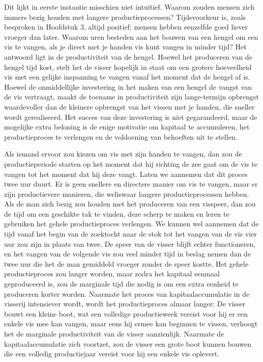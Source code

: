Dit lijkt in eerste instantie misschien niet intuïtief. Waarom zouden mensen zich immers bezig houden met langere productieprocessen? Tijdsvoorkeur is, zoals besproken in Hoofdstuk 3, altijd positief; mensen hebben eenzelfde goed liever vroeger dan later. Waarom uren besteden aan het bouwen van een hengel om een vis te vangen, als je direct met je handen vis kunt vangen in minder tijd? Het antwoord ligt in de productiviteit van de hengel. Hoewel het produceren van de hengel tijd kost, stelt het de visser hopelijk in staat om een grotere hoeveelheid vis met een gelijke inspanning te vangen vanaf het moment dat de hengel af is. Hoewel de onmiddellijke investering in het maken van een hengel de vangst van de vis vertraagt, maakt de toename in productiviteit zijn lange-termijn opbrengst waardevoller dan de kleinere opbrengst van het vissen met je handen, die sneller wordt gerealiseerd. Het succes van deze investering is niet gegarandeerd, maar de mogelijke extra beloning is de enige motivatie om kapitaal te accumuleren, het productieproces te verlengen en de voldoening van behoeften uit te stellen.\autocite{59a, 59b}

Als iemand ervoor zou kiezen om vis met zijn handen te vangen, dan zou de productieperiode starten op het moment dat hij richting de zee gaat om de vis te vangen tot het moment dat hij deze vangt. Laten we aannemen dat dit proces twee uur duurt. Er is geen snellere en directere manier om vis te vangen, maar er zijn productievere manieren, die weliswaar langere productieprocessen hebben. Als de man zich bezig zou houden met het produceren van een visspeer, dan zou de tijd om een geschikte tak te vinden, deze scherp te maken en leren te gebruiken het gehele productieproces verlengen. We kunnen wel aannemen dat de tijd vanaf het begin van de zoektocht naar de stok tot het vangen van de vis vier uur zou zijn in plaats van twee. De speer van de visser blijft echter functioneren, en het vangen van de volgende vis zou veel minder tijd in beslag nemen dan de twee uur die het de man gemiddeld vroeger zonder de speer kostte. Het gehele productieproces zou langer worden, maar zodra het kapitaal eenmaal geproduceerd is, zou de marginale tijd die nodig is om een extra eenheid te produceren korter worden. Naarmate het proces van kapitaalaccumulatie in de visserij intensiever wordt, wordt het productieproces almaar langer: De visser bouwt een kleine boot, wat een volledige productieweek vereist voor hij er een enkele vis mee kan vangen, maar eens hij ermee kan beginnen te vissen, verhoogt het de marginale productiviteit van de visser aanzienlijk. Naarmate de kapitaalaccumulatie zich voortzet, zou de visser een grote boot kunnen bouwen die een volledig productiejaar vereist voor hij een enkele vis oplevert.


